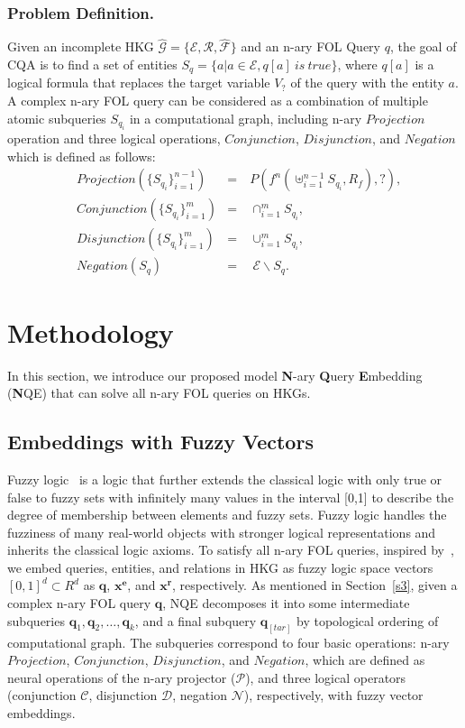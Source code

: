 \documentclass[letterpaper]{article} \usepackage{aaai23}  \usepackage{times}  \usepackage{helvet}  \usepackage{courier}  \usepackage[hyphens]{url}  \usepackage{graphicx} \urlstyle{rm} \def\UrlFont{\rm}  \usepackage{natbib}  \usepackage{caption} \frenchspacing  \setlength{\pdfpagewidth}{8.5in}  \setlength{\pdfpageheight}{11in}  \usepackage{algorithm}
\begin{document}
\subsubsection{Problem Definition.}
Given an incomplete HKG $\mathcal{\widehat{G}}=\{\mathcal{E},\mathcal{R},\mathcal{\widehat{F}}\}$ and an n-ary FOL Query $q$, the goal of CQA is to find a set of entities $S_q = \{a|a \in \mathcal{E}, q[a]\ is\ true\}$, where $q[a]$ is a logical formula that replaces the target variable $V_?$ of the query with the entity $a$.
A complex n-ary FOL query can be considered as a combination of multiple atomic subqueries $S_{q_i}$ in a computational graph, including n-ary $Projection$ operation and three logical operations, $Conjunction$, $Disjunction$, and $Negation$ which is defined as follows:
\begin{equation}
\begin{aligned}
&Projection(\{S_{q_i}\}_{i=1}^{n-1})&=&\ P(f^n(\uplus_{i=1}^{n-1} S_{q_i},R_f),?),\\
&Conjunction(\{S_{q_i}\}_{i=1}^m)&=&\ \cap_{i=1}^{m} S_{q_i},\\
&Disjunction(\{S_{q_i}\}_{i=1}^m)&=&\ \cup_{i=1}^{m} S_{q_i},\\
&Negation(S_q)&=&\ \ \mathcal{E}\backslash S_q.
\end{aligned}
\end{equation}

\section{Methodology}
In this section, we introduce our proposed model \textbf{N}-ary \textbf{Q}uery \textbf{E}mbedding (\textbf{N}QE) that can solve all n-ary FOL queries on HKGs.
\subsection{Embeddings with Fuzzy Vectors}
Fuzzy logic~\citep{logic1} is a logic that further extends the classical logic with only true or false to fuzzy sets with infinitely many values in the interval [0,1] to describe the degree of membership between elements and fuzzy sets. Fuzzy logic handles the fuzziness of many real-world objects with stronger logical representations and inherits the classical logic axioms. To satisfy all n-ary FOL queries, inspired by~\citep{FuzzQE}, we embed queries, entities, and relations in HKG as fuzzy logic space vectors $[0, 1]^d\subset R^d$ as $\boldsymbol{q}$, $\boldsymbol{x^e}$, and $\boldsymbol{x^r}$, respectively. As mentioned in Section~\ref{s3}, given a complex n-ary FOL query $\boldsymbol{q}$, 
NQE decomposes it into some intermediate subqueries $\boldsymbol{q}_1,\boldsymbol{q}_2,\ldots,\boldsymbol{q}_k$, and a final subquery $\boldsymbol{q}_{[tar]}$ by topological ordering of computational graph. The subqueries correspond to four basic operations: n-ary $Projection$, $Conjunction$, $Disjunction$, and $Negation$, which are defined as neural operations of the n-ary projector ($\mathcal{P}$), and three logical operators (conjunction $\mathcal{C}$, disjunction $\mathcal{D}$, negation $\mathcal{N}$), respectively, with fuzzy vector embeddings.
\end{document}
